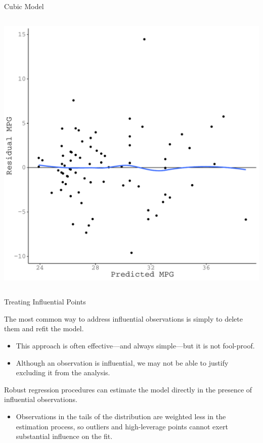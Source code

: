 \documentclass{beamer}\usepackage[]{graphicx}\usepackage[]{color}
\makeatletter
\def\maxwidth{ %
  \ifdim\Gin@nat@width>\linewidth
    \linewidth
  \else
    \Gin@nat@width
  \fi
}
\newenvironment{knitrout}{}{} %
\makeatother
\begin{document}
\begin{frame}{Cubic Model}
\begin{columns}
\begin{column}{0.5\textwidth}
\begin{knitrout}
{\centering \includegraphics[width=\maxwidth]{figure/unnamed-chunk-48-1} 

}



\end{knitrout}

\end{column}
\end{columns}
  
\end{frame}

\watermarkon %

\begin{frame}{Treating Influential Points}
  
  The most common way to address influential observations is simply to delete 
  them and refit the model.  
  \vc
  \begin{itemize}
  \item This approach is often effective---and always simple---but it is not
    fool-proof.
  \vc
  \item Although an observation is influential, we may not be able to justify 
    excluding it from the analysis.
  \end{itemize}
  \vb 
  Robust regression procedures can estimate the model directly in the
  presence of influential observations.  
  \vc
  \begin{itemize}
  \item Observations in the tails of the distribution are weighted less in the
    estimation process, so outliers and high-leverage points cannot exert
    substantial influence on the fit.
  \end{itemize}
  
\end{frame}
\end{document}
